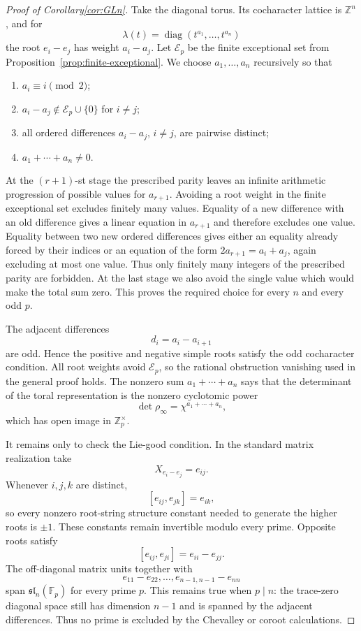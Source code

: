 \documentclass[11pt]{amsart}
\numberwithin{equation}{section}
\newcommand{\Z}{\mathbb Z}
\newcommand{\Fp}{\mathbb F_p}
\newcommand{\Zp}{\mathbb Z_p}
\newcommand{\cE}{\mathcal E}
\theoremstyle{definition}
\begin{document}
\begin{proof}[Proof of Corollary\ref{cor:GLn}]

Take the diagonal torus.  Its cocharacter lattice is $\Z^n$, and for
\[
        \lambda(t)=\operatorname{diag}
        (t^{a_1},\ldots,t^{a_n})
\]
the root $e_i-e_j$ has weight $a_i-a_j$.  Let $\cE_p$ be the finite
exceptional set from Proposition~\ref{prop:finite-exceptional}.  We
choose $a_1,\ldots,a_n$ recursively so that
\begin{enumerate}[label=\textup{(\arabic*)}]
\item $a_i\equiv i\pmod2$;
\item $a_i-a_j\notin\cE_p\cup\{0\}$ for $i\neq j$;
\item all ordered differences $a_i-a_j$, $i\neq j$, are pairwise
      distinct;
\item $a_1+\cdots+a_n\neq0$.
\end{enumerate}
At the $(r+1)$-st stage the prescribed parity leaves an infinite
arithmetic progression of possible values for $a_{r+1}$.  Avoiding a
root weight in the finite exceptional set excludes finitely many
values.  Equality of a new difference with an old difference gives a
linear equation in $a_{r+1}$ and therefore excludes one value.  Equality
between two new ordered differences gives either an equality already
forced by their indices or an equation of the form
$2a_{r+1}=a_i+a_j$, again excluding at most one value.  Thus only
finitely many integers of the prescribed parity are forbidden.  At the
last stage we also avoid the single value which would make the total
sum zero.  This proves the required choice for every $n$ and every odd
$p$.

The adjacent differences
\[
        d_i=a_i-a_{i+1}
\]
are odd.  Hence the positive and negative simple roots satisfy the odd
cocharacter condition.  All root weights avoid $\cE_p$, so the
rational obstruction vanishing used in the general proof holds.  The
nonzero sum $a_1+\cdots+a_n$ says that the determinant of the toral
representation is the nonzero cyclotomic power
\[
        \det\rho_\infty=\chi^{a_1+\cdots+a_n},
\]
which has open image in $\Zp^\times$.

It remains only to check the Lie-good condition.  In the standard
matrix realization take
\[
        X_{e_i-e_j}=e_{ij}.
\]
Whenever $i,j,k$ are distinct,
\[
        [e_{ij},e_{jk}]=e_{ik},
\]
so every nonzero root-string structure constant needed to generate the
higher roots is $\pm1$.  These constants remain invertible modulo every
prime.  Opposite roots satisfy
\[
        [e_{ij},e_{ji}]=e_{ii}-e_{jj}.
\]
The off-diagonal matrix units together with
\[
        e_{11}-e_{22},\ldots,e_{n-1,n-1}-e_{nn}
\]
span $\mathfrak{sl}_n(\Fp)$ for every prime $p$.  This remains true
when $p\mid n$: the trace-zero diagonal space still has dimension
$n-1$ and is spanned by the adjacent differences.  Thus no prime is
excluded by the Chevalley or coroot calculations.


\end{proof}
\end{document}
